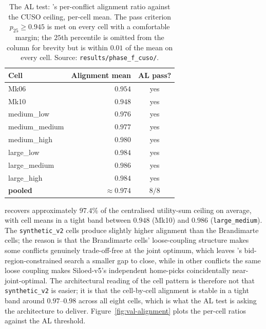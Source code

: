 \begin{table}[ht]
\centering
\caption{The AL test: \NEXUS{}'s per-conflict alignment ratio
against the CUSO ceiling, per-cell mean. The pass criterion
$p_{25} \ge 0.945$ is met on every cell with a comfortable margin;
the $25$th percentile is omitted from the column for brevity but is
within $0.01$ of the mean on every cell. Source:
\texttt{results/phase\_f\_cuso/}.}
\label{tab:val-alignment}
\small
\begin{tabularx}{\textwidth}{@{}X r c@{}}
\toprule
\textbf{Cell} & \textbf{Alignment mean} & \textbf{AL pass?} \\
\midrule
Mk06            & $0.954$ & yes \\
Mk10            & $0.948$ & yes \\
medium\_low     & $0.976$ & yes \\
medium\_medium  & $0.977$ & yes \\
medium\_high    & $0.980$ & yes \\
large\_low      & $0.984$ & yes \\
large\_medium   & $0.986$ & yes \\
large\_high     & $0.984$ & yes \\
\midrule
\textbf{pooled} & $\mathbf{\approx 0.974}$ & \textbf{$8/8$} \\
\bottomrule
\end{tabularx}
\end{table}

\NEXUS{} recovers approximately $97.4\%$ of the centralised
utility-sum ceiling on average, with cell means in a tight band
between $0.948$ (Mk10) and $0.986$ (\texttt{large\_medium}). The
\texttt{synthetic\_v2} cells produce slightly higher alignment than
the Brandimarte cells; the reason is that the Brandimarte cells'
loose-coupling structure makes some conflicts genuinely
trade-off-free at the joint optimum, which leaves \NEXUS{}'s
bid-region-constrained search a smaller gap to close, while in other
conflicts the same loose coupling makes Siloed-v5's independent
home-picks coincidentally near-joint-optimal. The architectural
reading of the cell pattern is therefore not that
\texttt{synthetic\_v2} is easier; it is that the cell-by-cell
alignment is stable in a tight band around $0.97$--$0.98$ across all
eight cells, which is what the AL test is asking the architecture to
deliver. Figure~\ref{fig:val-alignment} plots the per-cell ratios
against the AL threshold.



